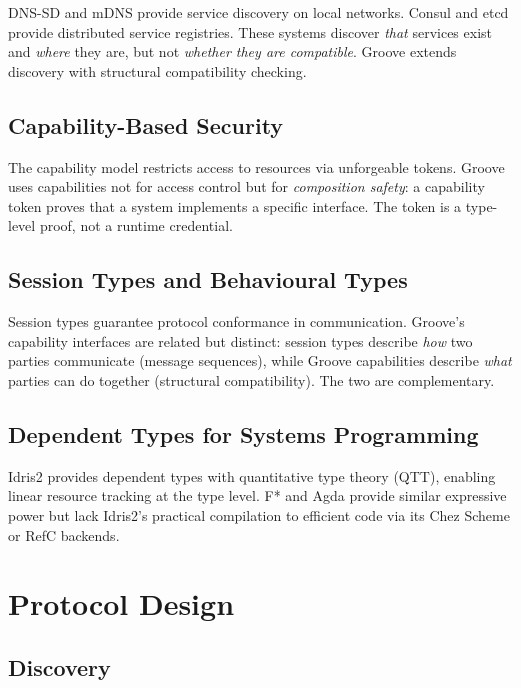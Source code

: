 \documentclass[11pt,a4paper]{article}
\begin{document}
DNS-SD \cite{rfc6763} and mDNS \cite{rfc6762} provide service discovery on
local networks. Consul and etcd provide distributed service registries. These
systems discover \emph{that} services exist and \emph{where} they are, but
not \emph{whether they are compatible}. Groove extends discovery with
structural compatibility checking.

\subsection{Capability-Based Security}

The capability model \cite{dennis1966} restricts access to resources via
unforgeable tokens. Groove uses capabilities not for access control but for
\emph{composition safety}: a capability token proves that a system implements
a specific interface. The token is a type-level proof, not a runtime
credential.

\subsection{Session Types and Behavioural Types}

Session types \cite{honda1993} guarantee protocol conformance in
communication. Groove's capability interfaces are related but distinct:
session types describe \emph{how} two parties communicate (message
sequences), while Groove capabilities describe \emph{what} parties can do
together (structural compatibility). The two are complementary.

\subsection{Dependent Types for Systems Programming}

Idris2 \cite{brady2021} provides dependent types with quantitative type
theory (QTT), enabling linear resource tracking at the type level. F*
\cite{fstar} and Agda \cite{norell2007} provide similar expressive power
but lack Idris2's practical compilation to efficient code via its Chez
Scheme or RefC backends.

\section{Protocol Design}

\subsection{Discovery}
\label{sec:discovery}
\end{document}
